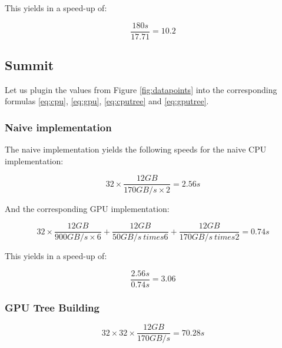 \documentclass[]{article}
\begin{document}
This yields in a speed-up of:
\begin{center}
	\begin{equation}
		\frac{180s}{17.71} = 10.2
	\end{equation}
\end{center}

\vspace{5mm}


\subsection{Summit}

Let us plugin the values from Figure \ref{fig:datapoints} into the corresponding formulas \ref{eq:cpu}, \ref{eq:gpu}, \ref{eq:cputree} and \ref{eq:gputree}.

\subsubsection{Naive implementation}
The naive implementation yields the following speeds for the naive CPU  implementation:

\begin{center}
	\begin{equation}
		32 \times \frac{ 12 GB }{170 GB/s \times 2} = 2.56s
	\end{equation}
\end{center}

And the corresponding GPU implementation:
\begin{center}
	\begin{equation}
		32 \times \frac{12 GB}{900 GB/s \times 6} + \frac{12 GB}{50 GB/s \ times 6}  + \frac{12 GB}{170 GB/s \ times 2} = 0.74s
	\end{equation}
\end{center}

This yields in a speed-up of:
\begin{center}
	\begin{equation}
		\frac{2.56s}{0.74s} = 3.06
	\end{equation}
\end{center}


\subsubsection{GPU Tree Building}

\begin{center}
	\begin{equation}
		32 \times 32 \times \frac{ 12 GB }{170 GB/s} = 70.28s
	\end{equation}
\end{center}
\end{document}
